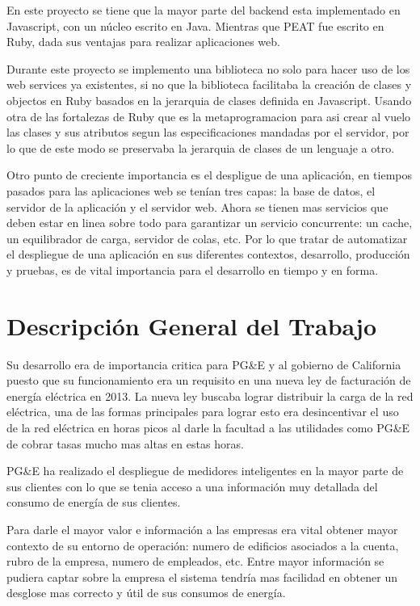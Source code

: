 \documentclass{article}
\begin{document}
En este proyecto se tiene que la mayor parte del backend esta implementado
en Javascript, con un núcleo escrito en Java. Mientras que PEAT fue escrito
en Ruby, dada sus ventajas para realizar aplicaciones web.

Durante este proyecto se implemento una biblioteca no solo para hacer uso de
los web services ya existentes, si no que la biblioteca facilitaba la creación
de clases y objectos en Ruby basados en la jerarquia de clases definida
en Javascript. Usando otra de las fortalezas de Ruby que es la metaprogramacion
para asi crear al vuelo las clases y sus atributos segun las especificaciones
mandadas por el servidor, por lo que de este modo se preservaba la jerarquia
de clases de un lenguaje a otro.

Otro punto de creciente importancia es el despligue de una aplicación, en tiempos
pasados para las aplicaciones web se tenían tres capas: la base de datos,
el servidor de la aplicación y el servidor web. Ahora se tienen mas servicios
que deben estar en linea sobre todo para garantizar un servicio concurrente:
un cache, un equilibrador de carga, servidor de colas, etc. Por lo que tratar
de automatizar el despliegue de una aplicación en sus diferentes contextos,
desarrollo, producción y pruebas, es de vital importancia para el desarrollo
en tiempo y en forma.

\section{Descripción General del Trabajo}
Su desarrollo era de importancia critica para PG\&E y al gobierno de
California puesto que su funcionamiento era un requisito en una nueva
ley de facturación de energía eléctrica en 2013. La nueva ley buscaba
lograr distribuir la carga de la red eléctrica, una de las formas
principales para lograr esto era desincentivar el uso de la red
eléctrica en horas picos al darle la facultad a las utilidades como PG\&E
de cobrar tasas mucho mas altas en estas horas.


PG\&E ha realizado el despliegue de medidores inteligentes en la
mayor parte de sus clientes con lo que se tenia acceso a una información
muy detallada del consumo de energía de sus clientes.

Para darle el mayor valor e información a las empresas era
vital obtener mayor contexto de su entorno de operación: numero
de edificios asociados a la cuenta, rubro de la empresa, numero de
empleados, etc. Entre mayor información se pudiera captar sobre la
empresa el sistema tendría mas facilidad en obtener un desglose
mas correcto y útil de sus consumos de energía.
\end{document}
